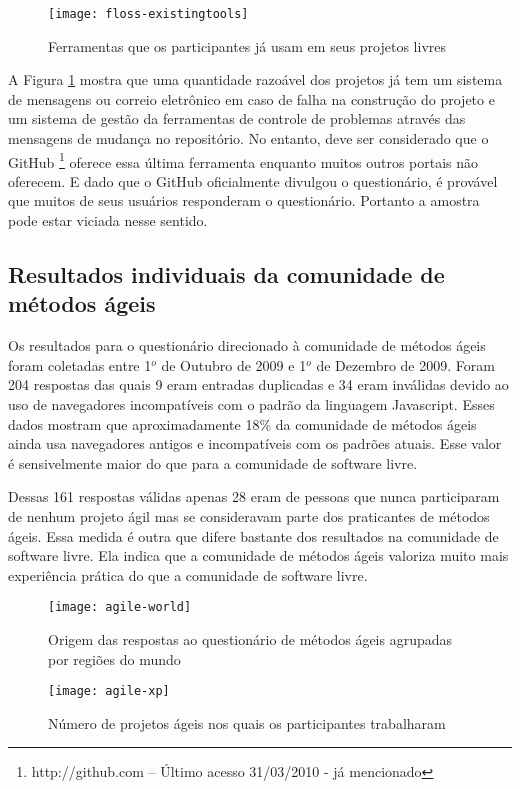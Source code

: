 \begin{figure}
  \centering
  \texttt{[image: floss-existingtools]}
  \caption{Ferramentas que os participantes já usam em seus projetos
    livres}
  \label{fig:floss-existingtools}
\end{figure}

A Figura \ref{fig:floss-existingtools} mostra que uma quantidade
razoável dos projetos já tem um sistema de mensagens ou correio
eletrônico em caso de falha na construção do projeto e um sistema de
gestão da ferramentas de controle de problemas através das mensagens
de mudança no repositório. No entanto, deve ser considerado que o
GitHub \footnote{http://github.com -- Último acesso 31/03/2010 - já
  mencionado} oferece essa última ferramenta enquanto muitos outros
portais não oferecem. E dado que o GitHub oficialmente divulgou o
questionário, é provável que muitos de seus usuários responderam o
questionário. Portanto a amostra pode estar viciada nesse sentido.

\subsection{Resultados individuais da comunidade de métodos ágeis}
\label{sec:resp-agile}

Os resultados para o questionário direcionado à comunidade de métodos
ágeis foram coletadas entre 1$^o$ de Outubro de 2009 e 1$^o$ de
Dezembro de 2009. Foram 204 respostas das quais 9 eram entradas
duplicadas e 34 eram inválidas devido ao uso de navegadores
incompatíveis com o padrão da linguagem Javascript. Esses dados
mostram que aproximadamente 18\% da comunidade de métodos ágeis ainda
usa navegadores antigos e incompatíveis com os padrões atuais. Esse
valor é sensivelmente maior do que para a comunidade de software
livre.

Dessas 161 respostas válidas apenas 28 eram de pessoas que nunca
participaram de nenhum projeto ágil mas se consideravam parte dos
praticantes de métodos ágeis. Essa medida é outra que difere bastante
dos resultados na comunidade de software livre. Ela indica que a
comunidade de métodos ágeis valoriza muito mais experiência prática do
que a comunidade de software livre.

\begin{figure}[htb]
  \begin{minipage}[t]{0.55\linewidth}
    \centering
    \texttt{[image: agile-world]}
    \caption{Origem das respostas ao questionário de métodos ágeis
      agrupadas por regiões do mundo}
    \label{fig:agile-world}
  \end{minipage}
  \begin{minipage}[t]{0.45\linewidth}
    \centering
    \texttt{[image: agile-xp]}
    \caption{Número de projetos ágeis nos quais os participantes
      trabalharam}
    \label{fig:agile-xp}
  \end{minipage}
\end{figure}

